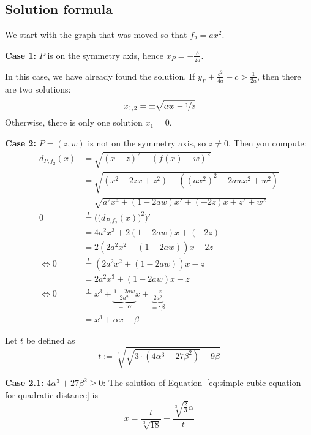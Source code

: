 \subsection{Solution formula}
We start with the graph that was moved so that $f_2 = ax^2$.

\textbf{Case 1:} $P$ is on the symmetry axis, hence $x_P = - \frac{b}{2a}$.

In this case, we have already found the solution. If $y_P + \frac{b^2}{4a} - c > \frac{1}{2a}$,
then there are two solutions:
\[x_{1,2} = \pm \sqrt{aw - \nicefrac{1}{2}}\]
Otherwise, there is only one solution $x_1 = 0$.

\textbf{Case 2:} $P = (z, w)$ is not on the symmetry axis, so $z \neq 0$. Then you compute:
\begin{align}
  d_{P,{f_2}}(x)  &= \sqrt{(x-z)^2 + (f(x)-w)^2}\\
    &= \sqrt{(x^2 - 2zx + z^2) + ((ax^2)^2 - 2 awx^2 + w^2)}\\
    &= \sqrt{a^2x^4 + (1- 2 aw)x^2 +(- 2z)x + z^2 + w^2}\\
  0 &\stackrel{!}{=} \Big(\big(d_{P, {f_2}}(x)\big)^2\Big)' \\
    &= 4a^2x^3 + 2(1- 2 aw)x +(- 2z)\\
    &= 2 \left (2a^2x^2 + (1- 2 aw) \right )x - 2z\\
    \Leftrightarrow 0 &\stackrel{!}{=} (2a^2x^2  + (1- 2 aw)) x - z\\
    &= 2 a^2 x^3 + (1- 2 aw) x - z\\
\Leftrightarrow 0 &\stackrel{!}{=} x^3 + \underbrace{\frac{1- 2 aw}{2 a^2}}_{=: \alpha} x  + \underbrace{\frac{-z}{2 a^2}}_{=: \beta}\\
    &= x^3 + \alpha x + \beta\label{eq:simple-cubic-equation-for-quadratic-distance}
\end{align}

Let $t$ be defined as
\[t := \sqrt[3]{\sqrt{3 \cdot (4 \alpha^3 + 27 \beta^2)} -9\beta}\]

\textbf{Case 2.1:} $4 \alpha^3 + 27 \beta^2 \geq 0$:
The solution of Equation~\ref{eq:simple-cubic-equation-for-quadratic-distance}
is
\[x = \frac{t}{\sqrt[3]{18}} - \frac{\sqrt[3]{\frac{2}{3}} \alpha }{t}\]

